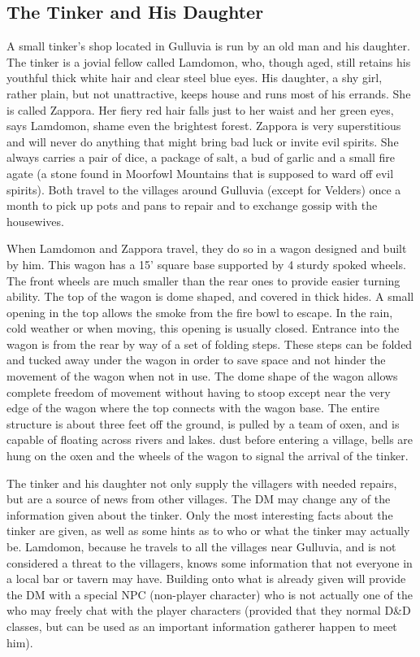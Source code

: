 \documentclass[palace_of_the_silver_princess]{subfiles}
\begin{document}
\subsection{The Tinker and His Daughter}

A small tinker’s shop located in Gulluvia is run by an old man and his
daughter. The tinker is a jovial fellow called Lamdomon, who, though
aged, still retains his youthful thick white hair and clear steel blue
eyes. His daughter, a shy girl, rather plain, but not unattractive,
keeps house and runs most of his errands. She is called Zappora. Her
fiery red hair falls just to her waist and her green eyes, says
Lamdomon, shame even the brightest forest. Zappora is very superstitious
and will never do anything that might bring bad luck or invite evil
spirits. She always carries a pair of dice, a package of salt, a bud of
garlic and a small fire agate (a stone found in Moorfowl Mountains that
is supposed to ward off evil spirits). Both travel to the villages
around Gulluvia (except for Velders) once a month to pick up pots and
pans to repair and to exchange gossip with the housewives.

When Lamdomon and Zappora travel, they do so in a wagon designed and
built by him. This wagon has a 15’ square base supported by 4 sturdy
spoked wheels. The front wheels are much smaller than the rear ones to
provide easier turning ability. The top of the wagon is dome shaped, and
covered in thick hides. A small opening in the top allows the smoke from
the fire bowl to escape. In the rain, cold weather or when moving, this
opening is usually closed. Entrance into the wagon is from the rear by
way of a set of folding steps. These steps can be folded and tucked away
under the wagon in order to save space and not hinder the movement of
the wagon when not in use. The dome shape of the wagon allows complete
freedom of movement without having to stoop except near the very edge of
the wagon where the top connects with the wagon base. The entire
structure is about three feet off the ground, is pulled by a team of
oxen, and is capable of floating across rivers and lakes. dust before
entering a village, bells are hung on the oxen and the wheels of the
wagon to signal the arrival of the tinker.

The tinker and his daughter not only supply the villagers with needed
repairs, but are a source of news from other villages.  The DM may
change any of the information given about the tinker. Only the most
interesting facts about the tinker are given, as well as some hints as
to who or what the tinker may actually be. Lamdomon, because he travels
to all the villages near Gulluvia, and is not considered a threat to the
villagers, knows some information that not everyone in a local bar or
tavern may have. Building onto what is already given will provide the DM
with a special NPC (non-player character) who is not actually one of the
who may freely chat with the player characters (provided that they
normal D\&D classes, but can be used as an important information gatherer
happen to meet him).
\end{document}
